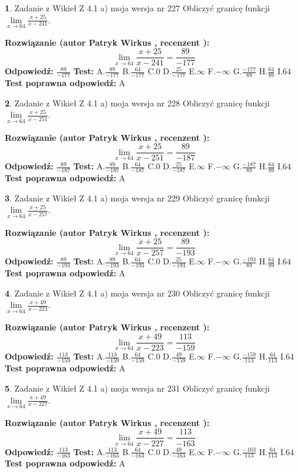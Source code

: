 \documentclass[12pt, a4paper]{article}
\theoremstyle{definition} %
\newtheorem{zad}{}
\newcommand{\zadStart}[1]{\begin{zad}#1\newline}
\newcommand{\zadStop}{\end{zad}}
\newcommand{\rozwStart}[2]{\noindent \textbf{Rozwiązanie (autor #1 , recenzent #2): }\newline}
\newcommand{\rozwStop}{\newline}
\newcommand{\odpStart}{\noindent \textbf{Odpowiedź:}\newline}
\newcommand{\odpStop}{\newline}
\newcommand{\testStart}{\noindent \textbf{Test:}\newline}
\newcommand{\testStop}{\newline}
\newcommand{\kluczStart}{\noindent \textbf{Test poprawna odpowiedź:}\newline}
\newcommand{\kluczStop}{\newline}
\begin{document}
\zadStart{Zadanie z Wikieł Z 4.1 a) moja wersja nr 227}
Obliczyć granicę funkcji $\lim\limits_{x\to64}\frac{x+25}{x-241}$.
\zadStop
\rozwStart{Patryk Wirkus}{}
$$\lim\limits_{x\to64}\frac{x+25}{x-241} = \frac{89}{-177}$$
\rozwStop
\odpStart
$\frac{89}{-177}$
\odpStop
\testStart
A.$\frac{89}{-177}$
B.$\frac{64}{-177}$
C.$0$
D.$\frac{25}{-177}$
E.$\infty$
F.$-\infty$
G.$\frac{-177}{89}$
H.$\frac{64}{89}$
I.$64$
\testStop
\kluczStart
A
\kluczStop



\zadStart{Zadanie z Wikieł Z 4.1 a) moja wersja nr 228}
Obliczyć granicę funkcji $\lim\limits_{x\to64}\frac{x+25}{x-251}$.
\zadStop
\rozwStart{Patryk Wirkus}{}
$$\lim\limits_{x\to64}\frac{x+25}{x-251} = \frac{89}{-187}$$
\rozwStop
\odpStart
$\frac{89}{-187}$
\odpStop
\testStart
A.$\frac{89}{-187}$
B.$\frac{64}{-187}$
C.$0$
D.$\frac{25}{-187}$
E.$\infty$
F.$-\infty$
G.$\frac{-187}{89}$
H.$\frac{64}{89}$
I.$64$
\testStop
\kluczStart
A
\kluczStop



\zadStart{Zadanie z Wikieł Z 4.1 a) moja wersja nr 229}
Obliczyć granicę funkcji $\lim\limits_{x\to64}\frac{x+25}{x-257}$.
\zadStop
\rozwStart{Patryk Wirkus}{}
$$\lim\limits_{x\to64}\frac{x+25}{x-257} = \frac{89}{-193}$$
\rozwStop
\odpStart
$\frac{89}{-193}$
\odpStop
\testStart
A.$\frac{89}{-193}$
B.$\frac{64}{-193}$
C.$0$
D.$\frac{25}{-193}$
E.$\infty$
F.$-\infty$
G.$\frac{-193}{89}$
H.$\frac{64}{89}$
I.$64$
\testStop
\kluczStart
A
\kluczStop



\zadStart{Zadanie z Wikieł Z 4.1 a) moja wersja nr 230}
Obliczyć granicę funkcji $\lim\limits_{x\to64}\frac{x+49}{x-223}$.
\zadStop
\rozwStart{Patryk Wirkus}{}
$$\lim\limits_{x\to64}\frac{x+49}{x-223} = \frac{113}{-159}$$
\rozwStop
\odpStart
$\frac{113}{-159}$
\odpStop
\testStart
A.$\frac{113}{-159}$
B.$\frac{64}{-159}$
C.$0$
D.$\frac{49}{-159}$
E.$\infty$
F.$-\infty$
G.$\frac{-159}{113}$
H.$\frac{64}{113}$
I.$64$
\testStop
\kluczStart
A
\kluczStop



\zadStart{Zadanie z Wikieł Z 4.1 a) moja wersja nr 231}
Obliczyć granicę funkcji $\lim\limits_{x\to64}\frac{x+49}{x-227}$.
\zadStop
\rozwStart{Patryk Wirkus}{}
$$\lim\limits_{x\to64}\frac{x+49}{x-227} = \frac{113}{-163}$$
\rozwStop
\odpStart
$\frac{113}{-163}$
\odpStop
\testStart
A.$\frac{113}{-163}$
B.$\frac{64}{-163}$
C.$0$
D.$\frac{49}{-163}$
E.$\infty$
F.$-\infty$
G.$\frac{-163}{113}$
H.$\frac{64}{113}$
I.$64$
\testStop
\kluczStart
A
\kluczStop
\end{document}
